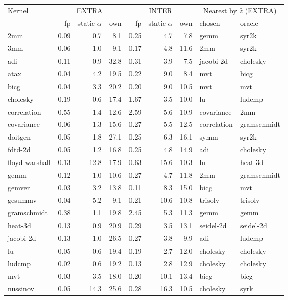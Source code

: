 \begin{tabular}{lrrrrrrll}
\toprule
Kernel & \multicolumn{3}{c}{EXTRA} & \multicolumn{3}{c}{INTER} & \multicolumn{2}{c}{Nearest by $\hat z$ (EXTRA)} \\
\cmidrule(lr){2-4}\cmidrule(lr){5-7}\cmidrule(lr){8-9}
 & fp & static $\alpha$ & own & fp & static $\alpha$ & own & chosen & oracle \\
\midrule
2mm & 0.09 & 0.7 & 8.1 & 0.25 & 4.7 & 7.8 & gemm & syr2k \\
3mm & 0.06 & 1.0 & 9.1 & 0.17 & 4.8 & 11.6 & 2mm & syr2k \\
adi & 0.11 & 0.9 & 32.8 & 0.31 & 3.9 & 7.5 & jacobi-2d & cholesky \\
atax & 0.04 & 4.2 & 19.5 & 0.22 & 9.0 & 8.4 & mvt & bicg \\
bicg & 0.04 & 3.3 & 20.2 & 0.20 & 9.0 & 10.5 & mvt & mvt \\
cholesky & 0.19 & 0.6 & 17.4 & 1.67 & 3.5 & 10.0 & lu & ludcmp \\
correlation & 0.55 & 1.4 & 12.6 & 2.59 & 5.6 & 10.9 & covariance & 2mm \\
covariance & 0.06 & 1.3 & 15.6 & 0.27 & 5.5 & 12.5 & correlation & gramschmidt \\
doitgen & 0.05 & 1.8 & 27.1 & 0.25 & 6.3 & 16.1 & symm & syr2k \\
fdtd-2d & 0.05 & 1.2 & 16.8 & 0.25 & 4.8 & 14.9 & adi & cholesky \\
floyd-warshall & 0.13 & 12.8 & 17.9 & 0.63 & 15.6 & 10.3 & lu & heat-3d \\
gemm & 0.12 & 1.0 & 10.6 & 0.27 & 4.7 & 11.8 & 2mm & gramschmidt \\
gemver & 0.03 & 3.2 & 13.8 & 0.11 & 8.3 & 15.0 & bicg & mvt \\
gesummv & 0.04 & 5.2 & 9.1 & 0.21 & 10.6 & 10.8 & trisolv & trisolv \\
gramschmidt & 0.38 & 1.1 & 19.8 & 2.45 & 5.3 & 11.3 & gemm & gemm \\
heat-3d & 0.13 & 0.9 & 20.9 & 0.29 & 3.5 & 13.1 & seidel-2d & seidel-2d \\
jacobi-2d & 0.13 & 1.0 & 26.5 & 0.27 & 3.8 & 9.9 & adi & ludcmp \\
lu & 0.05 & 0.6 & 19.4 & 0.19 & 2.7 & 12.0 & cholesky & cholesky \\
ludcmp & 0.02 & 0.6 & 19.2 & 0.13 & 2.8 & 12.9 & cholesky & cholesky \\
mvt & 0.03 & 3.5 & 18.0 & 0.20 & 10.1 & 13.4 & bicg & bicg \\
nussinov & 0.05 & 14.3 & 25.6 & 0.28 & 16.3 & 10.5 & cholesky & syrk \\

\end{tabular}
